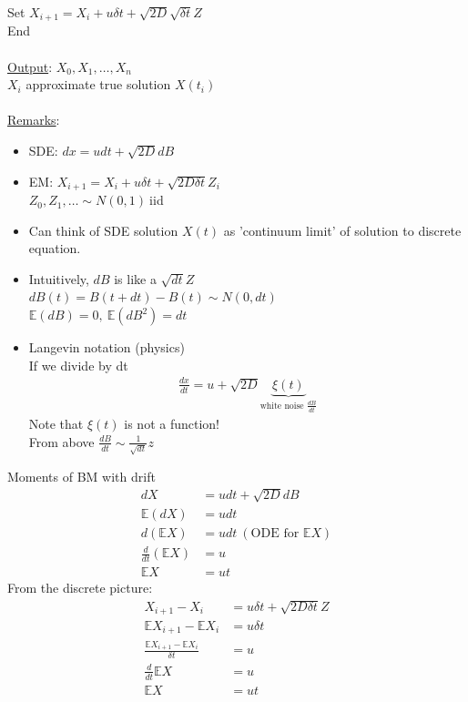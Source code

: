 \documentclass[12pt, letterpaper]{article}
\begin{document}
Set $X_{i+1} = X_i+u\delta t + \sqrt{2D} \sqrt{\delta t}Z$\\
End \\ \\ 
\underline{Output}: $X_0, X_1,\dots, X_n$ \\
$X_i$ approximate true solution $X(t_i)$ \\ \\ 
\underline{Remarks}:
\begin{itemize}
    \item SDE: $dx = udt + \sqrt{2D} dB$
    \item EM: $X_{i+1} =X_i + u\delta t + \sqrt{2D\delta t} Z_i$\\
    $Z_0, Z_1, \dots \sim N(0,1)\ $iid
    \item Can think of SDE solution $X(t)$ as 'continuum limit' of solution to discrete equation.
    \item Intuitively, $dB$ is like a $\sqrt{dt} Z$ \\
    $dB(t) = B(t+dt) - B(t) \sim N(0,dt)$ \\
    $\mathbb{E}(dB) = 0,\ \mathbb{E}(dB^2) = dt$
    \item Langevin notation (physics) \\
    If we divide by dt
    \begin{align*}
        \frac{dx}{dt} = u + \sqrt{2D} \underbrace{\xi(t)}_{\text{white noise } \frac{dB}{dt}}
    \end{align*}
    Note that $\xi(t)$ is not a function! \\
    From above $\frac{dB}{dt}\sim \frac1{\sqrt{dt}}z$
\end{itemize}
 Moments of BM with drift
\begin{align*}
    dX &= udt + \sqrt{2D}dB \\
    \mathbb{E}(dX) &= udt \\
    d(\mathbb{E}X) &= udt\ (\text{ODE for } \mathbb{E}X) \\
    \frac{d}{dt}(\mathbb{E}X) &= u \\
    \mathbb{E}X &= ut 
\end{align*}
From the discrete picture:
\begin{align*}
    X_{i+1} - X_i &= u\delta t + \sqrt{2D\delta t} Z\\
    \mathbb{E} X_{i+1} - \mathbb{E}X_i &= u \delta t \\
    \frac{\mathbb{E}X_{i+1}-\mathbb{E}X_i}{\delta t} &= u \\
    \frac{d}{dt} \mathbb{E}X &= u \\
    \mathbb{E}X &= ut
\end{align*}
\end{document}
